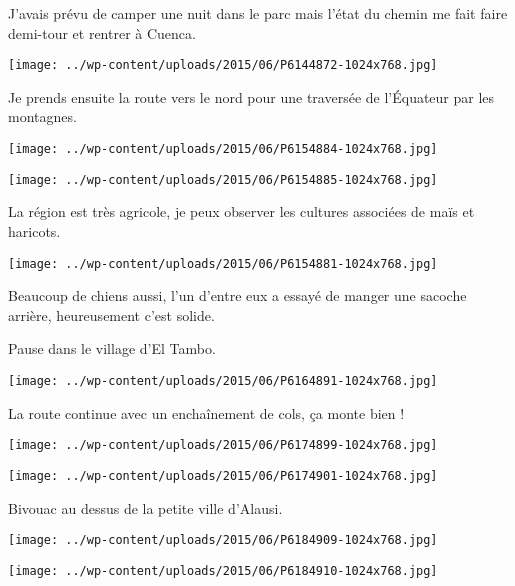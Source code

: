 J'avais prévu de camper une nuit dans le parc mais l'état du chemin me fait faire demi-tour et rentrer à Cuenca. 
\begin{center} \texttt{[image: ../wp-content/uploads/2015/06/P6144872-1024x768.jpg]} \end{center}

Je prends ensuite la route vers le nord pour une traversée de l'Équateur par les montagnes. 
\begin{center} \texttt{[image: ../wp-content/uploads/2015/06/P6154884-1024x768.jpg]} \end{center}
\begin{center} \texttt{[image: ../wp-content/uploads/2015/06/P6154885-1024x768.jpg]} \end{center}

La région est très agricole, je peux observer les cultures associées de maïs et haricots. 
\begin{center} \texttt{[image: ../wp-content/uploads/2015/06/P6154881-1024x768.jpg]} \end{center}
\pagebreak

Beaucoup de chiens aussi, l'un d'entre eux a essayé de manger une sacoche arrière, heureusement c'est solide.

Pause dans le village d'El Tambo. 
\begin{center} \texttt{[image: ../wp-content/uploads/2015/06/P6164891-1024x768.jpg]} \end{center}

La route continue avec un enchaînement de cols, ça monte bien ! 
\begin{center} \texttt{[image: ../wp-content/uploads/2015/06/P6174899-1024x768.jpg]} \end{center}
\begin{center} \texttt{[image: ../wp-content/uploads/2015/06/P6174901-1024x768.jpg]} \end{center}

Bivouac au dessus de la petite ville d'Alausi. 
\begin{center} \texttt{[image: ../wp-content/uploads/2015/06/P6184909-1024x768.jpg]} \end{center}
\begin{center} \texttt{[image: ../wp-content/uploads/2015/06/P6184910-1024x768.jpg]} \end{center}

